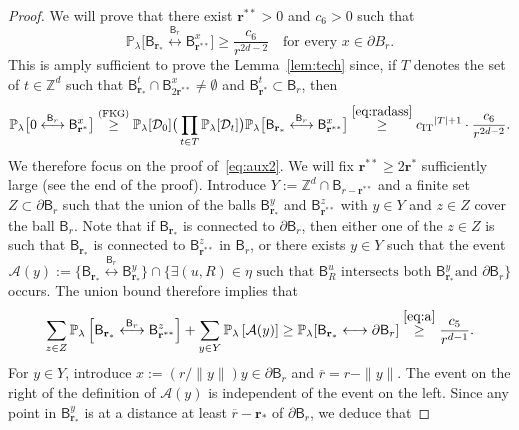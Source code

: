 \documentclass[10pt]{amsart}
\theoremstyle{definition}\newtheorem{defi}[theo]{Definition}\newtheorem{rema}[theo]{Remark}\newtheorem{exam}[theo]{Example}\newtheorem{exem}[theo]{Example}\newtheorem{nota}[theo]{Notation}
\newcommand{\rbf}{\mathbf{r}}
\DeclareMathOperator{\IT}{IT}
\DeclareMathOperator{\Fkg}{(FKG)}
\begin{document}
\begin{proof}
We will prove that there exist ${\rbf^{**}}>0$ and $c_6>0$ such that
\begin{equation}\label{eq:aux2}
{\mathbb P}_\lambda \big[\mathsf B_{\mathbf r_*} \stackrel{\mathsf B_r}{\longleftrightarrow} \mathsf B_{{\rbf^{**}}}^x \big] \geq \frac{c_6}{r^{2d - 2 }}\quad\text{for every }x\in\mathsf \partial B_r.
\end{equation}
This is amply sufficient to prove the Lemma~\ref{lem:tech} since, if $T$ denotes the set of $t\in{\mathbb Z}^d$ such that $\mathsf B^t_{\mathbf r_*}\cap \mathsf B_{2{\rbf^{**}}}^x\ne \emptyset$ and $\mathsf B^t_{\rbf^*}\subset \mathsf B_r$, then
\[
{\mathbb P}_\lambda \big[0 \stackrel{\mathsf B_r}{\longleftrightarrow} \mathsf B^x_{\rbf^*} \big]\stackrel{\Fkg}\ge {\mathbb P}_\lambda[{\mathcal D}_0]\big(\prod_{t\in T}{\mathbb P}_\lambda[{\mathcal D}_t]\big){\mathbb P}_\lambda \big[\mathsf B_{\mathbf r_*} \stackrel{\mathsf B_r}{\longleftrightarrow} \mathsf B_{{\rbf^{**}}}^x \big]\stackrel{\eqref{eq:radass}}\ge {c_{\IT}}^{|T|+1}\cdot \frac{c_6}{r^{2d - 2 }}.
\]
We therefore focus on the proof of~\eqref{eq:aux2}. We will fix ${\rbf^{**}}\ge 2 {\rbf^*}$ sufficiently large (see the end of the proof). Introduce $Y:={\mathbb Z}^d\cap \mathsf B_{r-{\rbf^{**}}}$ and a finite set $Z \subset \partial \mathsf B_r$ such that the union of the balls $\mathsf B_{\rbf_*}^{y}$ and $
\mathsf B_{{\rbf^{**}}}^{z}$ with $y \in Y$ and $z \in Z$ cover the ball $\mathsf B_r$. Note that if $\mathsf B_{\mathbf r_*}$ is connected to $\partial\mathsf B_r$, then either one of the $z\in Z$ is such that $\mathsf B_{\mathbf r_*}$ is connected to $\mathsf B_{{\rbf^{**}}}^z$ in $\mathsf B_r$, or there exists $y\in Y$ such that the event
\[
{\mathcal A}(y) := \big\lbrace \mathsf B_{\mathbf r_*} \stackrel{\mathsf B_r}{\longleftrightarrow} \mathsf B_{\rbf_*}^{y} \big \rbrace \cap
\big\lbrace \exists(u,R)\in\eta \text{ such that } \mathsf B_R^u \text{ intersects both } \mathsf B_{\rbf_*}^{y} \text{and } \partial\mathsf B_r\big\rbrace
\]
occurs. The union bound therefore implies that
\begin{equation}\label{eq:1}
\sum_{z\in Z}{\mathbb P}_\lambda\left[\mathsf B_{\mathbf r_*} \stackrel{\mathsf B_r}{\longleftrightarrow} \mathsf B_{{\rbf^{**}}}^z\right]+\sum_{\substack{y\in Y}}{\mathbb P}_\lambda\left[{\mathcal A}(y)]\ge {\mathbb P}_\lambda[\mathsf B_{\mathbf r_*}\longleftrightarrow \partial\mathsf B_r\right]\stackrel{\eqref{eq:a}}\ge \frac{c_5}{r^{d-1}}.
\end{equation}
For $y\in Y$, introduce $x:=(r/\|y\|)y\in\partial\mathsf B_r$ and $\overline r=r-\|y\|$. The event on the right of the definition of ${\mathcal A}(y)$ is independent of the event on the left. Since any point in $\mathsf B_{\rbf_*}^{y}$ is at a distance at least $\overline r-{\rbf_*}$ of $\partial\mathsf B_r$, we deduce that

\end{proof}
\end{document}
